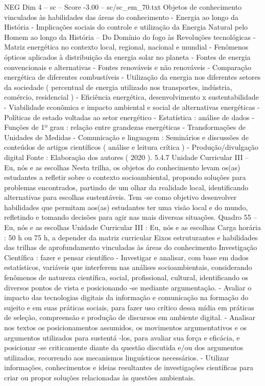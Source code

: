 \begin{textsample}{NEG Dim 4 – sc – Score -3.00 – sc/sc\_em\_70.txt}
Objetos de conhecimento vinculados às habilidades das áreas do conhecimento - Energia ao longo da História - Implicações sociais do controle e utilização da Energia Natural pelo Homem ao longo da História – Do Domínio do fogo às Revoluções tecnológicas - Matriz energética no contexto local, regional, nacional e mundial - Fenômenos ópticos aplicados à distribuição da energia solar no planeta - Fontes de energia convencionais e alternativas - Fontes renováveis e não renováveis - Comparação energética de diferentes combustíveis - Utilização da energia nos diferentes setores da sociedade ( percentual de energia utilizado nos transportes, indústria, comércio, residencial ) - Eficiência energética, desenvolvimento x sustentabilidade - Viabilidade econômica e impacto ambiental e social de alternativas energéticas - Políticas de estado voltadas ao setor energético - Estatística : análise de dados - Funções de 1º grau : relação entre grandezas energéticas - Transformações de Unidades de Medidas - Comunicação e linguagem : Seminários e discussões de conteúdos de artigos científicos ( análise e leitura crítica ) - Produção/divulgação digital Fonte : Elaboração dos autores ( 2020 ). 5.4.7 Unidade Curricular III – Eu, nós e as escolhas Nesta trilha, os objetos do conhecimento levam os(as) estudantes a refletir sobre o contexto socioambiental, propondo soluções para problemas encontrados, partindo de um olhar da realidade local, identificando alternativas para escolhas sustentáveis.
Tem -se como objetivo desenvolver habilidades que permitam aos(as) estudantes ter uma visão local e do mundo, refletindo e tomando decisões para agir nas mais diversas situações.
Quadro 55 – Eu, nós e as escolhas Unidade Curricular III : Eu, nós e as escolhas Carga horária : 50 h ou 75 h, a depender da matriz curricular Eixos estruturantes e habilidades das trilhas de aprofundamento vinculadas às áreas do conhecimento Investigação Científica : fazer e pensar científico - Investigar e analisar, com base em dados estatísticos, variáveis que interferem nas análises socioambientais, considerando fenômenos de natureza científica, social, profissional, cultural, identificando os diversos pontos de vista e posicionando -se mediante argumentação. - Avaliar o impacto das tecnologias digitais da informação e comunicação na formação do sujeito e em suas práticas sociais, para fazer uso crítico dessa mídia em práticas de seleção, compreensão e produção de discursos em ambiente digital. - Analisar nos textos os posicionamentos assumidos, os movimentos argumentativos e os argumentos utilizados para sustentá -los, para avaliar sua força e eficácia, e posicionar -se criticamente diante da questão discutida e/ou dos argumentos utilizados, recorrendo aos mecanismos linguísticos necessários. - Utilizar informações, conhecimentos e ideias resultantes de investigações científicas para criar ou propor soluções relacionadas às questões ambientais.

\end{textsample}
